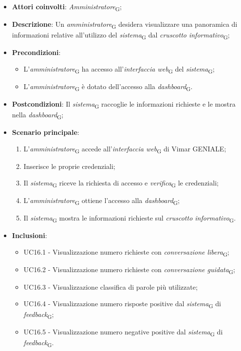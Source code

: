 \begin{itemize}
    \item \textbf{Attori coinvolti}: \textit{Amministratore}\textsubscript{G};
    \item \textbf{Descrizione}: Un \textit{amministratore}\textsubscript{G} desidera visualizzare una panoramica di informazioni relative all’utilizzo del \textit{sistema}\textsubscript{G} dal \textit{cruscotto informativo}\textsubscript{G};
    \item \textbf{Precondizioni}: 
    \begin{itemize}
        \item L’\textit{amministratore}\textsubscript{G} ha accesso all’\textit{interfaccia web}\textsubscript{G} del \textit{sistema}\textsubscript{G};
        \item L’\textit{amministratore}\textsubscript{G} è dotato dell’accesso alla \textit{dashboard}\textsubscript{G}.
    \end{itemize}
    \item \textbf{Postcondizioni}: Il \textit{sistema}\textsubscript{G} raccoglie le informazioni richieste e le mostra nella \textit{dashboard}\textsubscript{G};
    \item \textbf{Scenario principale}:
    \begin{enumerate}
        \item L’\textit{amministratore}\textsubscript{G} accede all’\textit{interfaccia web}\textsubscript{G} di Vimar GENIALE;
        \item Inserisce le proprie credenziali;
        \item Il \textit{sistema}\textsubscript{G} riceve la richiesta di accesso e \textit{verifica}\textsubscript{G} le credenziali;
        \item L’\textit{amministratore}\textsubscript{G} ottiene l’accesso alla \textit{dashboard}\textsubscript{G};
        \item Il \textit{sistema}\textsubscript{G} mostra le informazioni richieste sul \textit{cruscotto informativo}\textsubscript{G}.
    \end{enumerate}
    \item \textbf{Inclusioni}: 
    \begin{itemize}
        \item UC16.1 - Visualizzazione numero richieste con \textit{conversazione libera}\textsubscript{G};
        \item UC16.2 - Visualizzazione numero richieste con \textit{conversazione guidata}\textsubscript{G};
        \item UC16.3 - Visualizzazione classifica di parole più utilizzate;
        \item UC16.4 - Visualizzazione numero risposte positive dal \textit{sistema}\textsubscript{G} di \textit{feedback}\textsubscript{G};
        \item UC16.5 - Visualizzazione numero negative positive dal \textit{sistema}\textsubscript{G} di \textit{feedback}\textsubscript{G}.
    \end{itemize}
\end{itemize}
